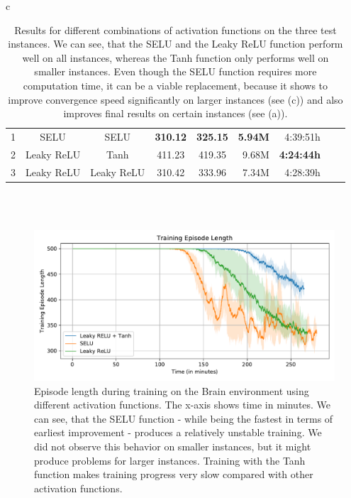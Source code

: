 \begin{table}[ht]
\begin{center}
\begin{tabular}{c}
\begin{tabular}{rccccrrrr}
                \midrule
                1 & SELU & SELU & \textbf{310.12} & \textbf{325.15} & \textbf{5.94M} & 4:39:51h \\
                2 & Leaky ReLU & Tanh & 411.23 & 419.35 & 9.68M & \textbf{4:24:44h} \\
                3 & Leaky ReLU & Leaky ReLU & 310.42 & 333.96 & 7.34M & 4:28:39h \\
                \bottomrule
            \end{tabular}\\
             \\
        \end{tabular}
    \end{center}
    \caption[Evaluation Results for Different Combinations of Activation Functions]{Results for different combinations of activation functions on the three test instances. We can see, that the SELU and the Leaky ReLU function perform well on all instances, whereas the Tanh function only performs well on smaller instances. Even though the SELU function requires more computation time, it can be a viable replacement, because it shows to improve convergence speed significantly on larger instances (see (c)) and also improves final results on certain instances (see (a)).} \label{tab:Eval/ActivationFunctions}
\end{table}

\begin{figure}[htp]
    \begin{center}
        \includegraphics[clip, width=0.8\columnwidth]{figures/evaluation/networks/maze0122_ep_len.pdf}
    \end{center}
    \caption[Episode Length Using Different Activation Functions on the Brain Environment]{Episode length during training on the Brain environment using different activation functions. The x-axis shows time in minutes. We can see, that the SELU function - while being the fastest in terms of earliest improvement - produces a relatively unstable training. We did not observe this behavior on smaller instances, but it might produce problems for larger instances. Training with the Tanh function makes training progress very slow compared with other activation functions.} \label{fig:Eval/ActivationFunctions/Maze0122}
\end{figure}

